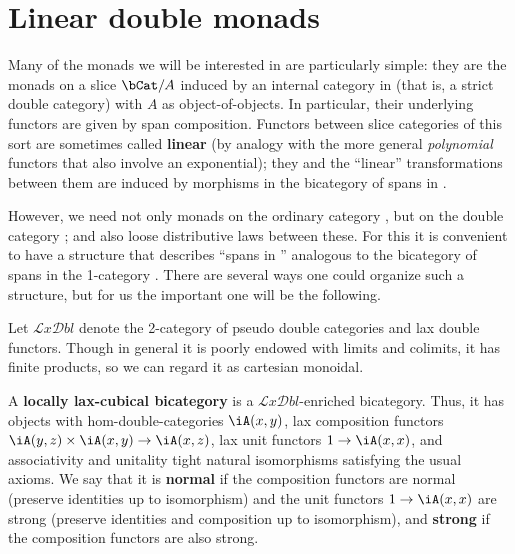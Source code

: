 \documentclass{amsart}
\def\lxdbl{\ensuremath{\mathcal{L}\mathit{x}\mathcal{D}\mathit{bl}}\xspace}
\begin{document}
\section{Linear double monads}
\label{sec:linear-double-monads}

Many of the monads we will be interested in are particularly simple: they are the monads on a slice $\bCat/A$ induced by an internal category in \bCat (that is, a strict double category) with $A$ as object-of-objects.
In particular, their underlying functors are given by span composition.
Functors between slice categories of this sort are sometimes called \textbf{linear} (by analogy with the more general \emph{polynomial} functors that also involve an exponential); they and the ``linear'' transformations between them are induced by morphisms in the bicategory of spans in \bCat.

However, we need not only monads on the ordinary category \bCat, but on the double category \dCat; and also loose distributive laws between these.
For this it is convenient to have a structure that describes ``spans in \dCat'' analogous to the bicategory of spans in the 1-category \bCat.
There are several ways one could organize such a structure, but for us the important one will be the following.

Let \lxdbl denote the 2-category of pseudo double categories and lax double functors.
Though in general it is poorly endowed with limits and colimits, it has finite products, so we can regard it as cartesian monoidal.

\begin{defn}
  A \textbf{locally lax-cubical bicategory} is a \lxdbl-enriched bicategory.
  Thus, it has objects with hom-double-categories $\iA(x,y)$, lax composition functors $\iA(y,z)\times \iA(x,y) \to \iA(x,z)$, lax unit functors $1\to \iA(x,x)$, and associativity and unitality tight natural isomorphisms satisfying the usual axioms.
  We say that it is \textbf{normal} if the composition functors are normal (preserve identities up to isomorphism) and the unit functors $1\to \iA(x,x)$ are strong (preserve identities and composition up to isomorphism), and \textbf{strong} if the composition functors are also strong.
\end{defn}
\end{document}
